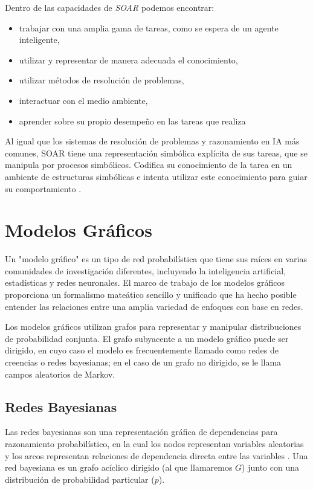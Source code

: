 Dentro de las capacidades de \emph{SOAR} podemos encontrar:

\begin{itemize}
  \item trabajar con una amplia gama de tareas, como se espera de un agente inteligente,
  \item utilizar y representar de manera adecuada el conocimiento,
  \item utilizar m\'{e}todos de resoluci\'{o}n de problemas,
  \item interactuar con el medio ambiente,
  \item aprender sobre su propio desempe\~no en las tareas que realiza 
\end{itemize}


Al igual que los sistemas de resolución de problemas y razonamiento en IA m\'{a}s comunes, SOAR tiene una representaci\'{o}n simb\'{o}lica expl\'{i}cita de sus tareas, que se manipula por procesos simb\'{o}licos. Codifica su conocimiento de la tarea en un ambiente de estructuras simb\'{o}licas e intenta utilizar este conocimiento para guiar su comportamiento \cite{laird1987soar}.

\section{Modelos Gr\'{a}ficos}
Un "modelo gráfico" es un tipo de red probabil\'{i}stica que tiene sus ra\'{i}ces en varias comunidades de investigaci\'{o}n diferentes, incluyendo la inteligencia artificial, estadísticas y redes neuronales. El marco de trabajo de los modelos gr\'{a}ficos proporciona un formalismo mate\'{a}tico sencillo y unificado que ha hecho posible entender las relaciones entre una amplia variedad de enfoques con base en redes.

Los modelos gr\'{a}ficos utilizan grafos para representar y manipular distribuciones de probabilidad conjunta. El grafo subyacente a un modelo gr\'{a}fico puede ser dirigido, en cuyo caso el modelo es frecuentemente llamado como redes de creencias o redes bayesianas; en el caso de un grafo no dirigido, se le llama campos aleatorios de Markov.
\subsection{Redes Bayesianas}

Las redes bayesianas son una representaci\'{o}n gr\'{a}fica de dependencias para razonamiento probabil\'{i}stico, en la cual los nodos representan variables aleatorias y los arcos representan relaciones de dependencia directa entre las variables \cite{torres1998bayesian}. Una red bayesiana es un grafo ac\'{i}clico dirigido (al que llamaremos $G$) junto con una distribuci\'{o}n de probabilidad particular ($p$).


